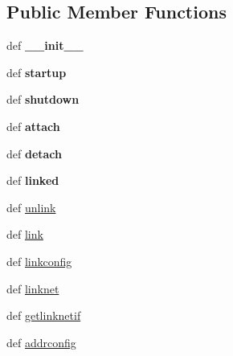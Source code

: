 \subsection*{Public Member Functions}
\begin{DoxyCompactItemize}
\item 
\hypertarget{classcore_1_1netns_1_1vnet_1_1_lx_br_net_a46987598b8922ef98e517fb85344bbad}{def {\bfseries \+\_\+\+\_\+init\+\_\+\+\_\+}}\label{classcore_1_1netns_1_1vnet_1_1_lx_br_net_a46987598b8922ef98e517fb85344bbad}

\item 
\hypertarget{classcore_1_1netns_1_1vnet_1_1_lx_br_net_a2c013bfc10d11a303f7acf194d20e501}{def {\bfseries startup}}\label{classcore_1_1netns_1_1vnet_1_1_lx_br_net_a2c013bfc10d11a303f7acf194d20e501}

\item 
\hypertarget{classcore_1_1netns_1_1vnet_1_1_lx_br_net_a83ecc2227d43815c53ebaee6d14beff8}{def {\bfseries shutdown}}\label{classcore_1_1netns_1_1vnet_1_1_lx_br_net_a83ecc2227d43815c53ebaee6d14beff8}

\item 
\hypertarget{classcore_1_1netns_1_1vnet_1_1_lx_br_net_a10457afb150a9a58d3f37939f75ce502}{def {\bfseries attach}}\label{classcore_1_1netns_1_1vnet_1_1_lx_br_net_a10457afb150a9a58d3f37939f75ce502}

\item 
\hypertarget{classcore_1_1netns_1_1vnet_1_1_lx_br_net_ac4f3f0c98702341c7eceb0c72f480e69}{def {\bfseries detach}}\label{classcore_1_1netns_1_1vnet_1_1_lx_br_net_ac4f3f0c98702341c7eceb0c72f480e69}

\item 
\hypertarget{classcore_1_1netns_1_1vnet_1_1_lx_br_net_a164f60f2c9468f371ed16fe8162dcc1a}{def {\bfseries linked}}\label{classcore_1_1netns_1_1vnet_1_1_lx_br_net_a164f60f2c9468f371ed16fe8162dcc1a}

\item 
def \hyperlink{classcore_1_1netns_1_1vnet_1_1_lx_br_net_af1b166b471dc5801c7c8257a4f7ebe61}{unlink}
\item 
def \hyperlink{classcore_1_1netns_1_1vnet_1_1_lx_br_net_a645b6feccb6d81d65ceff620f57aa228}{link}
\item 
def \hyperlink{classcore_1_1netns_1_1vnet_1_1_lx_br_net_a4931965d094f731963235e35ff7e52a6}{linkconfig}
\item 
def \hyperlink{classcore_1_1netns_1_1vnet_1_1_lx_br_net_a69bddc5a97938bbfe70e57976f0099a7}{linknet}
\item 
def \hyperlink{classcore_1_1netns_1_1vnet_1_1_lx_br_net_a6194d33696ab2c10eb1705f077922c79}{getlinknetif}
\item 
def \hyperlink{classcore_1_1netns_1_1vnet_1_1_lx_br_net_a8d6885aff37b841a11497e13780c4ef6}{addrconfig}
\end{DoxyCompactItemize}
